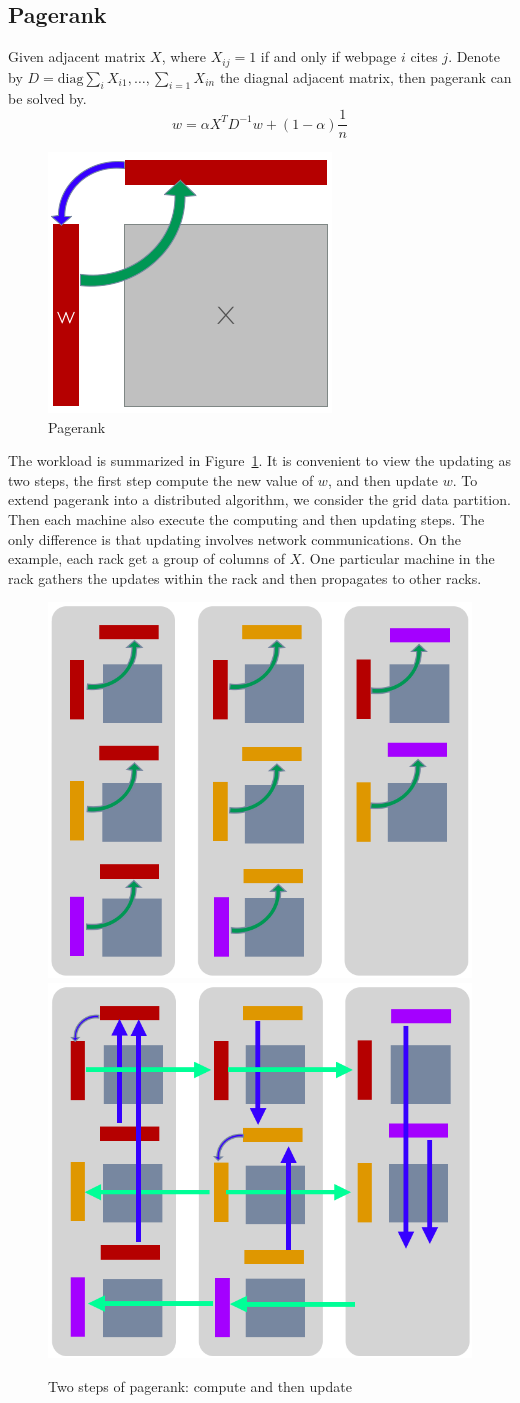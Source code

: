 \documentclass{acm_proc_article-sp}
\begin{document}
\subsection{Pagerank}
\label{sec:pagerank}

Given adjacent matrix $X$, where $X_{ij} = 1 $ if and only if webpage $i$ cites
$j$. Denote by $D=\textrm{diag}{\sum_i X_{i1}, \ldots, \sum_{i=1} X_{in}}$ the diagnal
adjacent matrix, then pagerank can be solved by.
\begin{equation}
  w = \alpha X^T D^{-1} w + (1-\alpha)\frac{1}{n}
\end{equation}

\begin{figure}[th!]
  \centering
  \includegraphics[width=.25\textwidth]{fig/pr}
  \caption{Pagerank}
  \label{fig:pr}
\end{figure}

The workload is summarized in Figure~\ref{fig:pr}. It is convenient to view the
updating as two steps, the
first step compute the new value of $w$, and then update $w$. To extend pagerank
into a distributed algorithm, we consider the grid data partition. Then each
machine also execute the computing and then updating steps. The only difference
is that updating involves network communications. On the example, each rack get
a group of columns of $X$. One particular  machine in the rack gathers the
updates within the rack and then propagates to other racks.

\begin{figure}[th!]
  \centering
  \includegraphics[width=.25\textwidth]{fig/compute}
  \includegraphics[width=.25\textwidth]{fig/update}
  \caption{Two steps of pagerank: compute and then update}
\end{figure}
\end{document}
